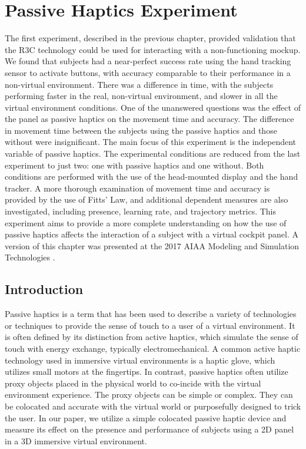 \chapter{Passive Haptics Experiment}
\label{chap:ph_exp}

The first experiment, described in the previous chapter, provided validation that the R3C technology could be used for interacting with a non-functioning mockup.
We found that subjects had a near-perfect success rate using the hand tracking sensor to activate buttons, with accuracy comparable to their performance in a non-virtual environment.
There was a difference in time, with the subjects performing faster in the real, non-virtual environment, and slower in all the virtual environment conditions.
One of the unanswered questions was the effect of the panel as passive haptics on the movement time and accuracy.
The difference in movement time between the subjects using the passive haptics and those without were insignificant.
The main focus of this experiment is the independent variable of passive haptics.
The experimental conditions are reduced from the last experiment to just two: one with passive haptics and one without.
Both conditions are performed with the use of the head-mounted display and the hand tracker.
A more thorough examination of movement time and accuracy is provided by the use of Fitts' Law, and additional dependent measures are also investigated, including presence, learning rate, and trajectory metrics.
This experiment aims to provide a more complete understanding on how the use of passive haptics affects the interaction of a subject with a virtual cockpit panel.
A version of this chapter was presented at the 2017 AIAA Modeling and Simulation Technologies \citep{joyce_passive_2017}.

\section{Introduction}

Passive haptics is a term that has been used to describe a variety of technologies or techniques to provide the sense of touch to a user of a virtual environment.
It is often defined by its distinction from active haptics, which simulate the sense of touch with energy exchange, typically electromechanical.
A common active haptic technology used in immersive virtual environments is a haptic glove, which utilizes small motors at the fingertips.
In contrast, passive haptics often utilize proxy objects placed in the physical world to co-incide with the virtual environment experience.
The proxy objects can be simple or complex.
They can be colocated and accurate with the virtual world or purposefully designed to trick the user.
In our paper, we utilize a simple colocated passive haptic device and measure its effect on the presence and performance of subjects using a 2D panel in a 3D immersive virtual environment.

